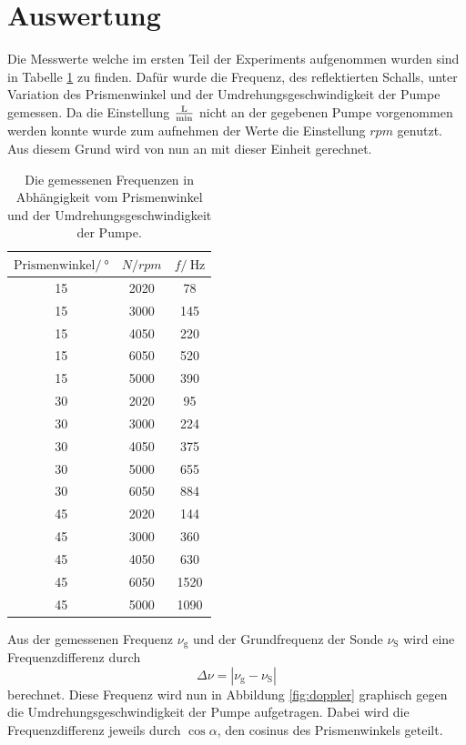 \section{Auswertung}
\label{sec:Auswertung}

Die Messwerte welche im ersten Teil der Experiments aufgenommen wurden sind in Tabelle \ref{tab:doppler} zu finden.
Dafür wurde die Frequenz, des reflektierten Schalls, unter Variation des Prismenwinkel und der Umdrehungsgeschwindigkeit der Pumpe gemessen.
Da die Einstellung $\si{\frac{\litre}{\minute}}$ nicht an der gegebenen Pumpe vorgenommen werden konnte wurde zum aufnehmen der Werte die Einstellung $rpm$ genutzt.
Aus diesem Grund wird von nun an mit dieser Einheit gerechnet.

\begin{table}
    \centering
    \begin{tabular}{ccc}
    \toprule
    $\text{Prismenwinkel}/\SI{}{\degree}$ & $N/rpm$ &  $f/\SI{}{\Hz}$ \\
    \midrule
    15 & 2020 & 78      \\
    15 & 3000 & 145     \\
    15 & 4050 & 220     \\
    15 & 6050 & 520     \\
    15 & 5000 & 390     \\
    30 & 2020 & 95      \\
    30 & 3000 & 224     \\
    30 & 4050 & 375     \\
    30 & 5000 & 655     \\
    30 & 6050 & 884     \\
    45 & 2020 & 144     \\
    45 & 3000 & 360     \\
    45 & 4050 & 630     \\
    45 & 6050 & 1520    \\
    45 & 5000 & 1090    \\
    \bottomrule
    \end{tabular}
    \caption{Die gemessenen Frequenzen in Abhängigkeit vom Prismenwinkel und der Umdrehungsgeschwindigkeit der Pumpe.}
    \label{tab:doppler}
\end{table}

Aus der gemessenen Frequenz $\nu_\text{g}$ und der Grundfrequenz der Sonde $\nu_\text{S}$ wird eine Frequenzdifferenz durch
\begin{equation*}
    \Delta \nu = \left| \nu_\text{g}-\nu_\text{S} \right|
\end{equation*}
berechnet. Diese Frequenz wird nun in Abbildung \ref{fig:doppler} graphisch gegen die Umdrehungsgeschwindigkeit der Pumpe aufgetragen.
Dabei wird die Frequenzdifferenz jeweils durch $\cos{\alpha}$, den cosinus des Prismenwinkels geteilt.

